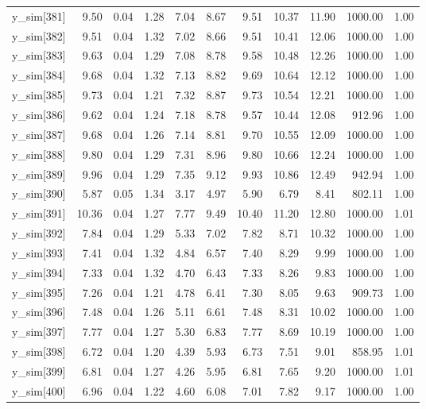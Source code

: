 \begin{table}[ht]
\begin{tabular}{rrrrrrrrrrr}
  y\_sim[381] & 9.50 & 0.04 & 1.28 & 7.04 & 8.67 & 9.51 & 10.37 & 11.90 & 1000.00 & 1.00 \\ 
  y\_sim[382] & 9.51 & 0.04 & 1.32 & 7.02 & 8.66 & 9.51 & 10.41 & 12.06 & 1000.00 & 1.00 \\ 
  y\_sim[383] & 9.63 & 0.04 & 1.29 & 7.08 & 8.78 & 9.58 & 10.48 & 12.26 & 1000.00 & 1.00 \\ 
  y\_sim[384] & 9.68 & 0.04 & 1.32 & 7.13 & 8.82 & 9.69 & 10.64 & 12.12 & 1000.00 & 1.00 \\ 
  y\_sim[385] & 9.73 & 0.04 & 1.21 & 7.32 & 8.87 & 9.73 & 10.54 & 12.21 & 1000.00 & 1.00 \\ 
  y\_sim[386] & 9.62 & 0.04 & 1.24 & 7.18 & 8.78 & 9.57 & 10.44 & 12.08 & 912.96 & 1.00 \\ 
  y\_sim[387] & 9.68 & 0.04 & 1.26 & 7.14 & 8.81 & 9.70 & 10.55 & 12.09 & 1000.00 & 1.00 \\ 
  y\_sim[388] & 9.80 & 0.04 & 1.29 & 7.31 & 8.96 & 9.80 & 10.66 & 12.24 & 1000.00 & 1.00 \\ 
  y\_sim[389] & 9.96 & 0.04 & 1.29 & 7.35 & 9.12 & 9.93 & 10.86 & 12.49 & 942.94 & 1.00 \\ 
  y\_sim[390] & 5.87 & 0.05 & 1.34 & 3.17 & 4.97 & 5.90 & 6.79 & 8.41 & 802.11 & 1.00 \\ 
  y\_sim[391] & 10.36 & 0.04 & 1.27 & 7.77 & 9.49 & 10.40 & 11.20 & 12.80 & 1000.00 & 1.01 \\ 
  y\_sim[392] & 7.84 & 0.04 & 1.29 & 5.33 & 7.02 & 7.82 & 8.71 & 10.32 & 1000.00 & 1.00 \\ 
  y\_sim[393] & 7.41 & 0.04 & 1.32 & 4.84 & 6.57 & 7.40 & 8.29 & 9.99 & 1000.00 & 1.00 \\ 
  y\_sim[394] & 7.33 & 0.04 & 1.32 & 4.70 & 6.43 & 7.33 & 8.26 & 9.83 & 1000.00 & 1.00 \\ 
  y\_sim[395] & 7.26 & 0.04 & 1.21 & 4.78 & 6.41 & 7.30 & 8.05 & 9.63 & 909.73 & 1.00 \\ 
  y\_sim[396] & 7.48 & 0.04 & 1.26 & 5.11 & 6.61 & 7.48 & 8.31 & 10.02 & 1000.00 & 1.00 \\ 
  y\_sim[397] & 7.77 & 0.04 & 1.27 & 5.30 & 6.83 & 7.77 & 8.69 & 10.19 & 1000.00 & 1.00 \\ 
  y\_sim[398] & 6.72 & 0.04 & 1.20 & 4.39 & 5.93 & 6.73 & 7.51 & 9.01 & 858.95 & 1.01 \\ 
  y\_sim[399] & 6.81 & 0.04 & 1.27 & 4.26 & 5.95 & 6.81 & 7.65 & 9.20 & 1000.00 & 1.01 \\ 
  y\_sim[400] & 6.96 & 0.04 & 1.22 & 4.60 & 6.08 & 7.01 & 7.82 & 9.17 & 1000.00 & 1.00 \\ 

\end{tabular}
\end{table}
